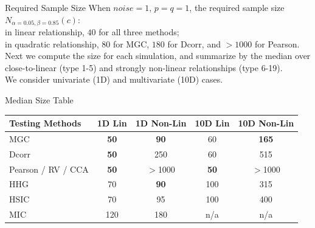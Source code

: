 \documentclass[mathserif,t]{beamer}
\newcommand{\Mgc}{MGC}
\begin{document}
\begin{frame}{Required Sample Size}
\pause
When $noise=1$, $p=q=1$, the required sample size $N_{\alpha=0.05,\beta=0.85}(c)$: \\
\medskip
\pause
in linear relationship, $40$ for all three methods; \\
in quadratic relationship, $80$ for \Mgc, $180$ for Dcorr, and $>1000$ for Pearson.\\

\medskip
\pause
Next we compute the size for each simulation, and summarize by the median over close-to-linear (type 1-5) and strongly non-linear relationships (type 6-19). \\

\medskip
\pause
We consider univariate (1D) and multivariate (10D) cases.\\ %
\end{frame}

\begin{frame}{Median Size Table}
\begin{tabular}{|l||c|c|c|c|}
\hline
Testing Methods & 1D Lin & 1D Non-Lin & 10D Lin & 10D Non-Lin   \\
\hline
 \textcolor{UniOrange}{MGC}  & \textbf{50}  & \textbf{90} & 60 & \textbf{165} \\
\hline 
 Dcorr & \textbf{50}  & 250 & 60 & 515 \\
\hline
Pearson / RV / CCA & \textbf{50}  & $>$1000 & \textbf{50} & $>$1000 \\
\hline
 HHG & 70  & \textbf{90} & 100 & 315  \\
\hline
HSIC & 70  & 95 & 100 & 400 \\
\hline
MIC & 120  & 180 & n/a & n/a \\
\hline
\end{tabular}
\end{frame}
\end{document}
